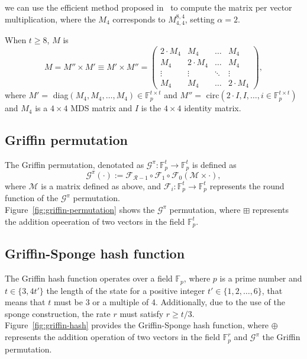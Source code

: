 we can use the efficient method proposed in~\cite{duval2018mds} to compute the matrix per vector multiplication, where the $M_4$ corresponds to $M_{4,4}^{8,4}$, setting $\alpha = 2$.

When $t \geq 8$, $M$ is
\begin{equation}
    M = M'' \times M' \equiv M' \times M'' =
    \begin{pmatrix}
        2\cdot M_4 & M_4 & \dots & M_4 \\
        M_4 & 2\cdot M_4 & \dots & M_4 \\
        \vdots & \vdots & \ddots & \vdots \\
        M_4 & M_4 & \dots & 2\cdot M_4
    \end{pmatrix}
    ,
\end{equation}
where $M'=$ diag$\left(M_4,M_4,\dots,M_4\right) \in \mathbb{F}_{p}^{t\times t}$ and $M'' =$ circ$\left(2\cdot I, I,\dots,i\in \mathbb{F}_{p}^{t\times t}\right)$ and $M_4$ is a $4\times 4$ MDS matrix and $I$ is the $4\times 4$ identity matrix.

\subsection*{Griffin permutation}
The Griffin permutation, denotated as $\mathcal{G}^\pi : \mathbb{F}_{p}^t \longrightarrow \mathbb{F}_{p}^t$ is defined as
\begin{equation}
    \mathcal{G}^\pi(\cdot) := \mathcal{F}_{\mathcal{R}-1} \circ \mathcal{F}_1 \circ \mathcal{F}_0(\mathcal{M}\times \cdot),
\end{equation}
where $\mathcal{M}$ is a matrix defined as above, and $\mathcal{F}_i : \mathbb{F}_{p}^t \longrightarrow \mathbb{F}_{p}^t$ represents the round function of the $\mathcal{G}^\pi$ permutation.\\
Figure~\ref{fig:griffin-permutation} shows the $\mathcal{G}^\pi$ permutation, where $\boxplus$ represents the addition opeeration of two vectors in the field $\mathbb{F}_{p}^t$.

\subsection*{Griffin-Sponge hash function}
The Griffin hash function operates over a field $\mathbb{F}_{p}$, where $p$ is a prime number and $t\in \{3,4t'\}$ the length of the state for a positive integer $t' \in \{1,2,\dots,6\}$, that means that $t$ must be 3 or a multiple of 4. Additionally, due to the use of the sponge construction, the rate $r$ must satisfy $r \geq t/3$.\\
Figure~\ref{fig:griffin-hash} provides the Griffin-Sponge hash function, where $\oplus$ represents the addition operation of two vectors in the field $\mathbb{F}_{p}^r$ and $\mathcal{G}^\pi$ the Griffin permutation.

